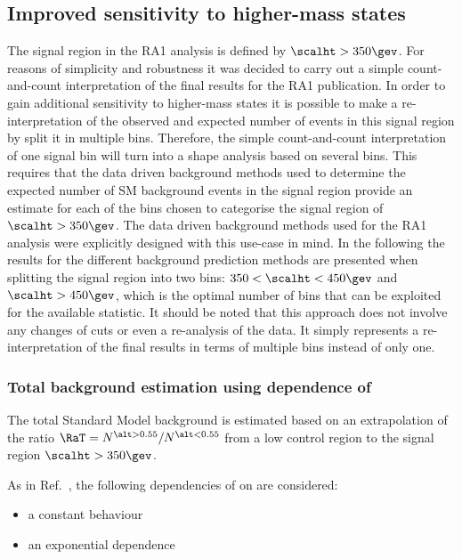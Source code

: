 \subsection{Improved sensitivity to higher-mass states \label{sec:shape-analysis}}
The signal region in the RA1 analysis is defined by  $\scalht > 350 \gev$.  For reasons of simplicity and robustness it was decided to carry out a simple count-and-count interpretation of the final results for the RA1 publication. In order to gain additional sensitivity to higher-mass states it is possible to make a re-interpretation of the observed and expected number of events in this signal region by split it in multiple \scalht bins. Therefore, the simple count-and-count interpretation of one signal bin will turn into a \scalht shape analysis based on several bins. This requires that the data driven background methods used to determine the expected number of SM background events in the signal region provide an estimate for each of the \scalht bins chosen to categorise the signal region of $\scalht > 350 \gev$. The data driven background methods used for the RA1 analysis were explicitly designed with this use-case in mind. In the following the results for the different background prediction methods are presented when splitting the signal region into two bins: $350 < \scalht < 450 \gev$ and $\scalht > 450 \gev$, which is the optimal number of bins that can be exploited for the available statistic. It should be noted that this approach does not involve any changes of cuts or even a re-analysis of the data. It simply represents a re-interpretation of the final results in terms of multiple \scahlt bins instead of only one.


\subsubsection{Total background estimation using \scalht dependence of \RaT}

The total Standard Model background is estimated based on an extrapolation of 
the ratio $\RaT = N^{\alt > 0.55}/N^{\alt < 0.55}$ from a low \scalht control 
region to the signal region $\scalht > 350 \gev$.

As in Ref.~\cite{RA1Paper}, the following dependencies of \RaT on \scalht are considered:
\begin{itemize}
\item a constant behaviour
\item an exponential dependence
\end{itemize}

